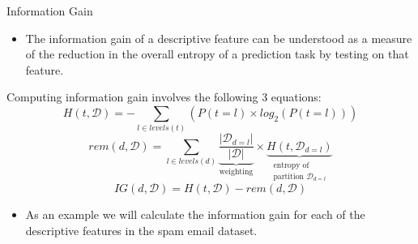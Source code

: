 \documentclass[xcolor={table}]{beamer}
\begin{document}
\begin{frame}
\begin{block}{Information Gain}
\begin{itemize}
	\item The information gain of a descriptive feature can be understood as a measure of the reduction in the overall entropy of a prediction task by testing on that feature. 
\end{itemize}
\end{block}
\end{frame}

 \begin{frame} 
Computing information gain involves the following 3 equations: 
\begin{equation}
H\left(t, \mathcal{D}\right) = - \sum_{l \in levels(t)} \left( P(t=l) \times log_2(P(t=l)) \right)
\label{eq:hds}
\end{equation}
\begin{equation}
rem\left(d,\mathcal{D}\right) = 
\sum_{l \in levels\left(d\right)} 
\underbrace{
\frac{|\mathcal{D}_{d=l}|}{|\mathcal{D}|}}_{\text{weighting}} \times
 \underbrace{H\left(t, \mathcal{D}_{d=l}\right)}_{
	\substack{
		\text{entropy of}\\
		\text{partition }\mathcal{D}_{d=l}
	}
}
\label{eq:ent-rem}
\end{equation}
\begin{equation}
IG\left(d,\mathcal{D}\right) = H\left(t,\mathcal{D}\right) - rem\left(d, \mathcal{D}\right)
\label{eq:info-gain}
\end{equation}
\end{frame} 

\begin{frame}
	\begin{itemize}
		\item As an example we will calculate the information gain for each of the descriptive features in the spam email dataset.
	\end{itemize}
\end{frame}
\end{document}

